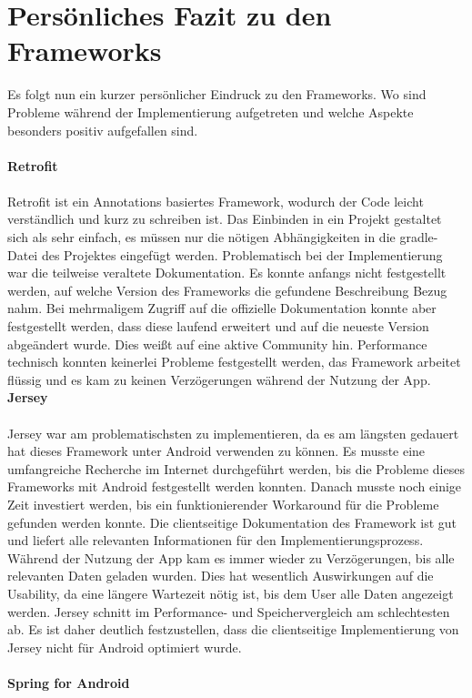 \section{Persönliches Fazit zu den Frameworks}
Es folgt nun ein kurzer persönlicher Eindruck zu den Frameworks. Wo sind Probleme während der Implementierung aufgetreten und welche Aspekte besonders positiv aufgefallen sind.
\\\\
{\large \textbf{Retrofit}}\\\\
Retrofit ist ein Annotations basiertes Framework, wodurch der Code leicht verständlich und kurz zu schreiben ist. Das Einbinden in ein Projekt gestaltet sich als sehr einfach, es müssen nur die nötigen Abhängigkeiten in die gradle-Datei des Projektes eingefügt werden. Problematisch bei der Implementierung war die teilweise veraltete Dokumentation. Es konnte anfangs nicht festgestellt werden, auf welche Version des Frameworks die gefundene Beschreibung Bezug nahm. Bei mehrmaligem Zugriff auf die offizielle Dokumentation konnte aber festgestellt werden, dass diese laufend erweitert und auf die neueste Version abgeändert wurde. Dies weißt auf eine aktive Community hin. Performance technisch konnten keinerlei Probleme festgestellt werden, das Framework arbeitet flüssig und es kam zu keinen Verzögerungen während der Nutzung der App.
\newpage
{\large \textbf{Jersey}}\\\\
Jersey war am problematischsten zu implementieren, da es am längsten gedauert hat dieses Framework unter Android verwenden zu können. Es musste eine umfangreiche Recherche im Internet durchgeführt werden, bis die Probleme dieses Frameworks mit Android festgestellt werden konnten. Danach musste noch einige Zeit investiert werden, bis ein funktionierender Workaround für die Probleme gefunden werden konnte. Die clientseitige Dokumentation des Framework ist gut und liefert alle relevanten Informationen für den Implementierungsprozess. Während der Nutzung der App kam es immer wieder zu Verzögerungen, bis alle relevanten Daten geladen wurden. Dies hat wesentlich Auswirkungen auf die Usability, da eine längere Wartezeit nötig ist, bis dem User alle Daten angezeigt werden. Jersey schnitt im Performance- und Speichervergleich am schlechtesten ab. Es ist daher deutlich festzustellen, dass die clientseitige Implementierung von Jersey nicht für Android optimiert wurde.
\\\\
{\large \textbf{Spring for Android}}\\\\

